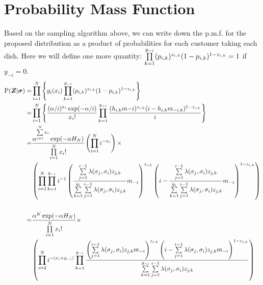 
\section{Probability Mass Function}
Based on the sampling algorithm above, we can write down the p.m.f. for the
proposed distribution as a product of probabilities for each customer taking
each dish. Here we will define one more quantity:
$\prod\limits_{k=1}^{y_{-i}} (p_{i,k})^{z_{i,k}}(1-p_{i,k})^{1-z_{i,k}}=1$ if $y_{-i}=0$.\\

\begin{align*}
  \text{P}(\bm Z|\bm\sigma)
  =&\prod\limits_{i=1}^{N} \left\{g_i(x_i) \prod\limits_{k=1}^{y_{-i}} 
    (p_{i,k})^{z_{i,k}}(1-p_{i,k})^{1-z_{i,k}}\right\}\\
  =&\prod\limits_{i=1}^{N} \left\{ \displaystyle\frac{(\alpha/i)^{x_i}\exp(-\alpha/i)}{x_i!} 
    \prod\limits_{k=1}^{y_{-i}} 
    \displaystyle\frac{(h_{i,k}m{-i})^{z_{i,k}}(i-h_{i,k}m_{-i,k})^{1-z_{i,k}}}{i} 
    \right\} \\
  =&\displaystyle\frac{\alpha^{\sum\limits_{i=1}^{N}x_i} \exp(-\alpha H_N)} {\prod\limits_{i=1}^{N}x_i!} 
    \left( \prod\limits_{i=1}^{N}i^{-x_i} \right) \times
    \\
    &\left( \prod\limits_{i=1}^{N}\prod\limits_{k=1}^{y_{-i}} i^{-1}
    \displaystyle\left(\displaystyle\frac{\sum\limits_{j=1}^{i-1}\lambda(\sigma_j,\sigma_i)z_{j,k}} {\sum\limits_{k=1}^{y_i}\sum\limits_{j=1}^{i-1}\lambda(\sigma_j,\sigma_i)z_{j,k}} m_{-i}\right)^{z_{i,k}}
       \left(i-\displaystyle\frac{\sum\limits_{j=1}^{i-1}\lambda(\sigma_j,\sigma_i)z_{j,k}} {\sum\limits_{k=1}^{y_i}\sum\limits_{j=1}^{i-1}\lambda(\sigma_j,\sigma_i)z_{j,k}} m_{-i}\right)^{1-z_{i,k}} \right)\\
   &\\
  =&\displaystyle\frac{\alpha^K \exp(-\alpha H_N)} {\prod\limits_{i=1}^{N}x_i!} \times
    \\
    &\left( \prod\limits_{i=2}^{N} i^{-(x_i+y_{-i})}\prod\limits_{k=1}^{y_{-i}} 
    \displaystyle\frac{
    \left(\sum\limits_{j=1}^{i-1}\lambda(\sigma_j,\sigma_i)z_{j,k}m_{-i}\right)^{z_{i,k}}
    \left(i-\sum\limits_{j=1}^{i-1}
    \lambda(\sigma_j,\sigma_i)z_{j,k}m_{-i}\right)^{1-z_{i,k}}
    }
    {\sum\limits_{k=1}^{y_{-i}}\sum\limits_{j=1}^{i-1}\lambda(\sigma_j,\sigma_i)z_{j,k}}\right)
\end{align*}\\

